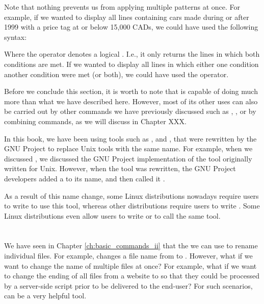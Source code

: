 Note that nothing prevents us from applying multiple patterns at once. For example, if we wanted to display all lines containing cars made during or after 1999 with a price tag at or below 15,000 CADs, we could have used the following syntax:


Where the \mycommand{\&\&} operator denotes a logical . I.e., it only returns the lines in which both conditions are met. If we wanted to display all lines in which either one condition  another condition were met (or both), we could have used the \mycommand{||} operator.

Before we conclude this section, it is worth to note that  is capable of doing much more than what we have described here. However, most of its other uses can also be carried out by other commands we have previously discussed such as , , or by combining commands, as we will discuss in Chapter XXX.

\begin{my_box}
In this book, we have been using tools such as , and , that were rewritten by the GNU Project to replace Unix tools with the same name. For example, when we discussed , we discussed the GNU Project implementation of the  tool originally written for Unix. However, when the  tool was rewritten, the GNU Project developers added a  to its name, and then called it .

As a result of this name change, some Linux distributions nowadays require users to write  to use this tool, whereas other distributions require users to write . Some Linux distributions even allow users to write  or  to call the same tool.
\end{my_box}

\section{}

We have seen in Chapter \ref{ch:basic_commands_ii} that the we can use  to rename individual files. For example,  changes a file name from  to . However, what if we want to change the name of multiple files at once? For example, what if we want to change the ending of all  files from a website to  so that they could be processed by a server-side script prior to be delivered to the end-user? For such scenarios,  can be a very helpful tool.

